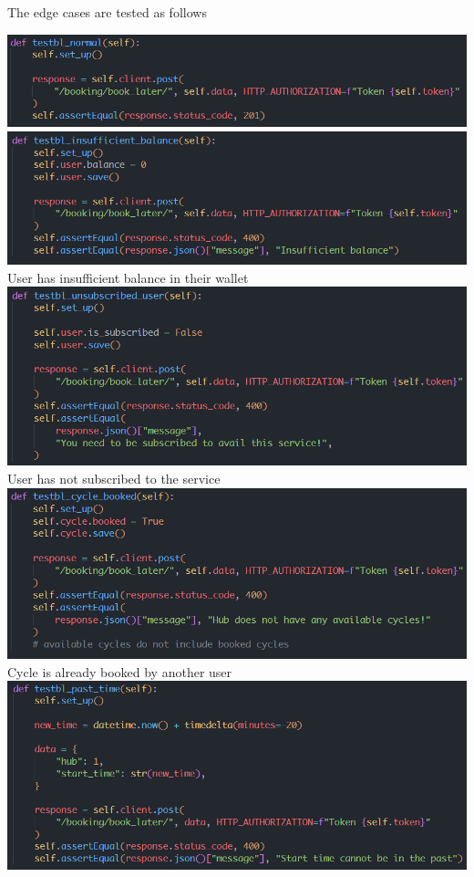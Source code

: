 \documentclass[11pt]{article}
\begin{document}
The edge cases are tested as follows

\begin{center}
    \includegraphics[scale=0.7]{unit_testing_codes/book_later_1.png}\\
    \includegraphics[scale=0.7]{unit_testing_codes/book_later_2.png}\\
    User has insufficient balance in their wallet\\
    \includegraphics[scale=0.7]{unit_testing_codes/book_later_3.png}\\
    User has not subscribed to the service\\
    \includegraphics[scale=0.7]{unit_testing_codes/book_later_4.png}\\
    Cycle is already booked by another user\\
    \includegraphics[scale=0.6]{unit_testing_codes/book_later_5.png}\\

\end{center}
\end{document}
